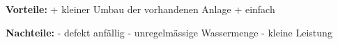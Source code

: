 \bigskip

\textbf{Vorteile:}								\newline
+	kleiner Umbau der vorhandenen Anlage			\newline						
+	einfach										\newline
	
\textbf{Nachteile:}								\newline
- 	defekt anfällig								\newline
-	unregelmässige Wassermenge						\newline
-	kleine Leistung								\newline

